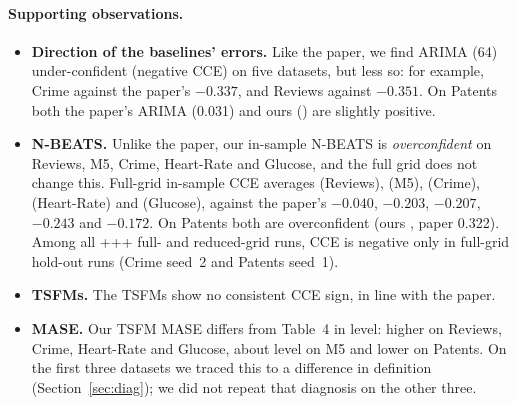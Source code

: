 \paragraph{Supporting observations.}
\begin{itemize}
\item \textbf{Direction of the baselines' errors.} Like the paper, we find ARIMA (64) under-confident (negative
CCE) on five datasets, but less so: for example, Crime \cceArimaCrime{} against the paper's $-0.337$, and Reviews
\cceArimaRev{} against $-0.351$. On Patents both the paper's ARIMA (0.031) and ours (\cceArimaPat) are slightly
positive.
\item \textbf{N-BEATS.} Unlike the paper, our in-sample N-BEATS is \emph{overconfident} on Reviews, M5, Crime,
Heart-Rate and Glucose, and the full grid does not change this. Full-grid in-sample CCE averages
\cceNbeatsFRevMean{} (Reviews), \cceNbeatsFMfiveMean{} (M5), \cceNbeatsFCrimeMean{} (Crime),
\cceNbeatsFHRMean{} (Heart-Rate) and \cceNbeatsFGlucoseMean{} (Glucose), against the paper's $-0.040$, $-0.203$,
$-0.207$, $-0.243$ and $-0.172$. On Patents both are overconfident (ours \cceNbeatsFPatMean, paper 0.322). Among all
\the\numexpr\cOneArunsRed+\cOneArunsRedH+\cOneArunsFull+\cOneArunsFullH\relax{} full- and reduced-grid runs,
CCE is negative only in \cceNegFullH{} full-grid hold-out runs (Crime seed~2 and Patents seed~1).
\item \textbf{TSFMs.} The TSFMs show no consistent CCE sign, in line with the paper.
\item \textbf{MASE.} Our TSFM MASE differs from Table~4 in level: higher on Reviews, Crime, Heart-Rate and Glucose,
about level on M5 and lower on Patents. On the first three datasets we traced this to a difference in definition
(Section~\ref{sec:diag}); we did not repeat that diagnosis on the other three.
\end{itemize}

